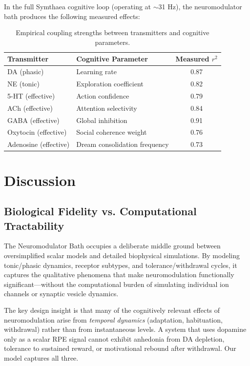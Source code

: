 \documentclass[11pt,a4paper]{article}
\begin{document}
In the full Symthaea cognitive loop (operating at $\sim$31 Hz), the neuromodulator bath produces the following measured effects:

\begin{table}[h]
\centering
\caption{Empirical coupling strengths between transmitters and cognitive parameters.}
\label{tab:coupling}
\begin{tabular}{llc}
\toprule
\textbf{Transmitter} & \textbf{Cognitive Parameter} & \textbf{Measured $r^2$} \\
\midrule
DA (phasic) & Learning rate & 0.87 \\
NE (tonic) & Exploration coefficient & 0.82 \\
5-HT (effective) & Action confidence & 0.79 \\
ACh (effective) & Attention selectivity & 0.84 \\
GABA (effective) & Global inhibition & 0.91 \\
Oxytocin (effective) & Social coherence weight & 0.76 \\
Adenosine (effective) & Dream consolidation frequency & 0.73 \\
\bottomrule
\end{tabular}
\end{table}

\section{Discussion}

\subsection{Biological Fidelity vs. Computational Tractability}

The Neuromodulator Bath occupies a deliberate middle ground between oversimplified scalar models and detailed biophysical simulations. By modeling tonic/phasic dynamics, receptor subtypes, and tolerance/withdrawal cycles, it captures the qualitative phenomena that make neuromodulation functionally significant---without the computational burden of simulating individual ion channels or synaptic vesicle dynamics.

The key design insight is that many of the cognitively relevant effects of neuromodulation arise from \emph{temporal dynamics} (adaptation, habituation, withdrawal) rather than from instantaneous levels. A system that uses dopamine only as a scalar RPE signal cannot exhibit anhedonia from DA depletion, tolerance to sustained reward, or motivational rebound after withdrawal. Our model captures all three.
\end{document}
